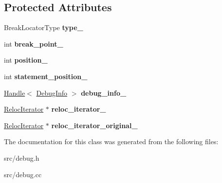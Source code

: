 \subsection*{Protected Attributes}
\begin{DoxyCompactItemize}
\item 
\hypertarget{classv8_1_1internal_1_1_break_location_iterator_ac126b8a353a7e956516a207587734bf9}{}Break\+Locator\+Type {\bfseries type\+\_\+}\label{classv8_1_1internal_1_1_break_location_iterator_ac126b8a353a7e956516a207587734bf9}

\item 
\hypertarget{classv8_1_1internal_1_1_break_location_iterator_ac0c6967408f990999dc89463d2510319}{}int {\bfseries break\+\_\+point\+\_\+}\label{classv8_1_1internal_1_1_break_location_iterator_ac0c6967408f990999dc89463d2510319}

\item 
\hypertarget{classv8_1_1internal_1_1_break_location_iterator_a3318006fbece586ebe3aa963bf59aa7d}{}int {\bfseries position\+\_\+}\label{classv8_1_1internal_1_1_break_location_iterator_a3318006fbece586ebe3aa963bf59aa7d}

\item 
\hypertarget{classv8_1_1internal_1_1_break_location_iterator_af526907057b119ab62c34b642265e8e4}{}int {\bfseries statement\+\_\+position\+\_\+}\label{classv8_1_1internal_1_1_break_location_iterator_af526907057b119ab62c34b642265e8e4}

\item 
\hypertarget{classv8_1_1internal_1_1_break_location_iterator_a00fa72ce32d26ee04d00466598d1bb7f}{}\hyperlink{classv8_1_1internal_1_1_handle}{Handle}$<$ \hyperlink{classv8_1_1internal_1_1_debug_info}{Debug\+Info} $>$ {\bfseries debug\+\_\+info\+\_\+}\label{classv8_1_1internal_1_1_break_location_iterator_a00fa72ce32d26ee04d00466598d1bb7f}

\item 
\hypertarget{classv8_1_1internal_1_1_break_location_iterator_a726207fd38b00af0247682333bcf92b5}{}\hyperlink{classv8_1_1internal_1_1_reloc_iterator}{Reloc\+Iterator} $\ast$ {\bfseries reloc\+\_\+iterator\+\_\+}\label{classv8_1_1internal_1_1_break_location_iterator_a726207fd38b00af0247682333bcf92b5}

\item 
\hypertarget{classv8_1_1internal_1_1_break_location_iterator_a861e0b261c8ddaa0f926c6691cc1f90e}{}\hyperlink{classv8_1_1internal_1_1_reloc_iterator}{Reloc\+Iterator} $\ast$ {\bfseries reloc\+\_\+iterator\+\_\+original\+\_\+}\label{classv8_1_1internal_1_1_break_location_iterator_a861e0b261c8ddaa0f926c6691cc1f90e}

\end{DoxyCompactItemize}


The documentation for this class was generated from the following files\+:\begin{DoxyCompactItemize}
\item 
src/debug.\+h\item 
src/debug.\+cc\end{DoxyCompactItemize}
